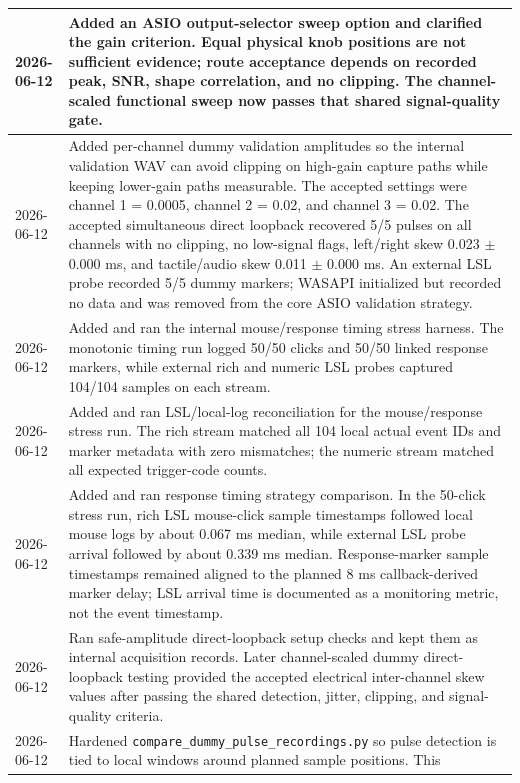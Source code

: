 \documentclass[11pt]{article}
\begin{document}
\begin{longtable}{|p{}|p{}|}
\hline
2026-06-12 & Added an ASIO output-selector sweep option and clarified the gain
criterion. Equal physical knob positions are not sufficient evidence; route
acceptance depends on recorded peak, SNR, shape correlation, and no clipping.
The channel-scaled functional sweep now passes that shared signal-quality gate. \\
\hline
2026-06-12 & Added per-channel dummy validation amplitudes so the internal
validation WAV can avoid clipping on high-gain capture paths while keeping
lower-gain paths measurable. The accepted settings were channel 1 = 0.0005,
channel 2 = 0.02, and channel 3 = 0.02. The accepted simultaneous direct
loopback recovered 5/5 pulses on all channels with no clipping, no low-signal
flags, left/right skew 0.023 $\pm$ 0.000 ms, and tactile/audio skew
0.011 $\pm$ 0.000 ms. An external LSL probe recorded 5/5 dummy markers; WASAPI
initialized but recorded no data and was removed from the core ASIO validation
strategy. \\
\hline
2026-06-12 & Added and ran the internal mouse/response timing stress harness.
The monotonic timing run logged 50/50 clicks and 50/50 linked
response markers, while external rich and numeric LSL probes captured 104/104
samples on each stream. \\
\hline
2026-06-12 & Added and ran LSL/local-log reconciliation for the mouse/response
stress run. The rich stream matched all 104 local actual event IDs and marker
metadata with zero mismatches; the numeric stream matched all expected
trigger-code counts. \\
\hline
2026-06-12 & Added and ran response timing strategy comparison. In the
50-click stress run, rich LSL mouse-click sample timestamps followed local
mouse logs by about 0.067 ms median, while external LSL probe arrival followed
by about 0.339 ms median. Response-marker sample timestamps remained aligned to
the planned 8 ms callback-derived marker delay; LSL arrival time is documented
as a monitoring metric, not the event timestamp. \\
\hline
2026-06-12 & Ran safe-amplitude direct-loopback setup checks and kept them as
internal acquisition records. Later channel-scaled dummy direct-loopback testing
provided the accepted electrical inter-channel skew values after passing the
shared detection, jitter, clipping, and signal-quality criteria.
\\
\hline
2026-06-12 & Hardened \texttt{compare\_dummy\_pulse\_recordings.py} so pulse
detection is tied to local windows around planned sample positions. This

\end{longtable}
\end{document}
